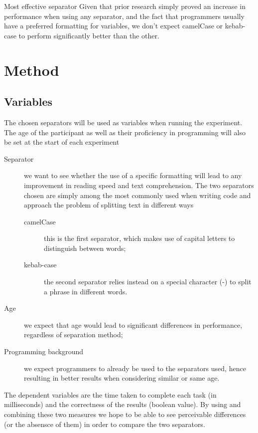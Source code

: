 \documentclass{article}
\begin{document}
\begin{Hypotheses*}{Most effective separator}{}
	Given that prior research simply proved an increase in performance when using any separator, and the fact that 
	programmers usually have a preferred formatting for variables, we don't expect camelCase or kebab-case to perform 
	significantly better than the other.
\end{Hypotheses*}

\section{Method}
\subsection{Variables}
The chosen separators will be used as variables when running the experiment. The age of the participant as well as their proficiency in programming 
will also be set at the start of each experiment
\begin{description}
	\item[Separator] we want to see whether the use of a specific formatting will lead to any improvement in reading speed and text comprehension. 
	The two separators chosen are simply among the most commonly used when writing code and approach the problem of 
	splitting text in different ways
	\begin{description}
		\item[camelCase] this is the first separator, which makes use of capital letters to distinguish between words;
		\item[kebab-case] the second separator relies instead on a special character (-) to split a phrase in different words.
	\end{description}
	\item[Age] we expect that age would lead to significant differences in performance, regardless of separation method;
	\item[Programming background] we expect programmers to already be used to the separators used, hence resulting in better results when considering 
	similar or same age.
\end{description}

The dependent variables are the time taken to complete each task (in milliseconds) and the correctness of the results (boolean value). By using and combining these 
two measures we hope to be able to see perceivable differences (or the absensce of them) in order to compare the two separators.
\end{document}

